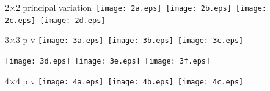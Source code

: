 \documentclass[12pt]{article}
\begin{document}

2$\times$2 principal variation\hfill\
\texttt{[image: 2a.eps]}\hfill\
\texttt{[image: 2b.eps]}\hfill\
\texttt{[image: 2c.eps]}\hfill\
\texttt{[image: 2d.eps]}\hfill~
\vfill

3$\times$3 p v\hfill
\texttt{[image: 3a.eps]}\hfill\
\texttt{[image: 3b.eps]}\hfill\
\texttt{[image: 3c.eps]}\hfill~
\vfill

\hfill
\texttt{[image: 3d.eps]}\hfill\
\texttt{[image: 3e.eps]}\hfill\
\texttt{[image: 3f.eps]}\hfill~
\vfill

4$\times$4 p v\hfill
\texttt{[image: 4a.eps]}\hfill\
\texttt{[image: 4b.eps]}\hfill\
\texttt{[image: 4c.eps]}\hfill~
\end{document}
